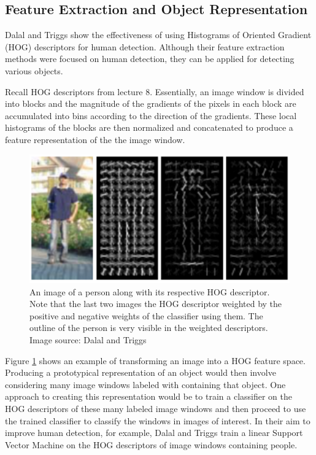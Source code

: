 \documentclass{article}
\begin{document}
\subsection{Feature Extraction and Object Representation}
Dalal and Triggs \cite{hog_human_detection} show the effectiveness of using Histograms of Oriented Gradient (HOG) descriptors for human detection. Although their feature extraction methods were focused on human detection, they can be applied for detecting various objects. 

Recall HOG descriptors from lecture 8. Essentially, an image window is divided into blocks and the magnitude of the gradients of the pixels in each block are accumulated into bins according to the direction of the gradients. These local histograms of the blocks are then normalized and concatenated to produce a feature representation of the the image window.

\begin{figure}[H]
	\includegraphics[width=\linewidth, scale=0.3]{person_template.png}
	\caption{An image of a person along with its respective HOG descriptor. Note that the last two images the HOG descriptor weighted by the positive and negative weights of the classifier using them. The outline of the person is very visible in the weighted descriptors. Image source: Dalal and Triggs \cite{hog_human_detection}}
    \label{fig:hog_descriptor}
\end{figure}

Figure \ref{fig:hog_descriptor} shows an example of transforming an image into a HOG feature space. Producing a prototypical representation of an object would then involve considering many image windows labeled with containing that object. One approach to creating this representation would be to train a classifier on the HOG descriptors of these many labeled image windows and then proceed to use the trained classifier to classify the windows in images of interest. In their aim to improve human detection, for example, Dalal and Triggs \cite{hog_human_detection} train a linear Support Vector Machine on the HOG descriptors of image windows containing people.
\end{document}

